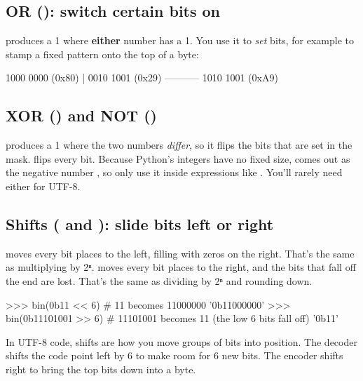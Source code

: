 \documentclass[10pt,a4paper]{article}
\begin{document}
\subsection{OR (\code{\textbar{}\allowbreak{}}): switch certain bits on}
 produces a 1 where \textbf{either} number has a 1. You use it to \emph{set} bits, for example to stamp a fixed pattern onto the top of a byte:
\begin{txtcode}
    1000 0000     (0x80)
  | 0010 1001     (0x29)
  -----------
    1010 1001     (0xA9)
\end{txtcode}
\subsection{XOR (\code{\textasciicircum{}}) and NOT (\code{\textasciitilde{}})}
 produces a 1 where the two numbers \emph{differ}, so it flips the bits that are set in the mask.  flips every bit. Because Python’s integers have no fixed size,  comes out as the negative number , so only use it inside expressions like . You’ll rarely need either for UTF-8.
\subsection{Shifts (\code{\textless{}\allowbreak{}\textless{}\allowbreak{}} and \code{\textgreater{}\allowbreak{}\textgreater{}\allowbreak{}}): slide bits left or right}
 moves every bit  places to the left, filling with zeros on the right. That’s the same as multiplying by 2ⁿ.  moves every bit  places to the right, and the bits that fall off the end are lost. That’s the same as dividing by 2ⁿ and rounding down.
\begin{txtcode}
>>> bin(0b11 << 6)       # 11 becomes 11000000
'0b11000000'
>>> bin(0b11101001 >> 6) # 11101001 becomes 11 (the low 6 bits fall off)
'0b11'
\end{txtcode}
In UTF-8 code, shifts are how you move groups of bits into position. The decoder shifts the code point left by 6 to make room for 6 new bits. The encoder shifts right to bring the top bits down into a byte.
\end{document}
